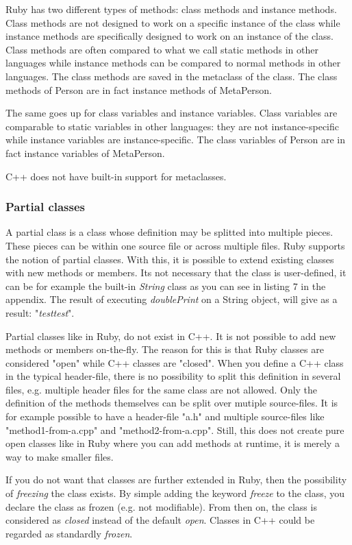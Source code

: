 \documentclass[10pt,a4paper,twocolumn]{article}
\begin{document}
Ruby has two different types of methods: class methods and instance methods. Class methods are not designed to work on a specific instance of the class while instance methods are specifically designed to work on an instance of the class. Class methods are often compared to what we call static methods in other languages while instance methods can be compared to normal methods in other languages. The class methods are saved in the metaclass of the class. The class methods of Person are in fact instance methods of MetaPerson.

The same goes up for class variables and instance variables. Class variables are comparable to static variables in other languages: they are not instance-specific while instance variables are instance-specific. The class variables of Person are in fact instance variables of MetaPerson.

C++ does not have built-in support for metaclasses.

\subsubsection{Partial classes}
A partial class is a class whose definition may be splitted into multiple pieces. These pieces can be within one source file or across multiple files. Ruby supports the notion of partial classes. With this, it is possible to extend existing classes with new methods or members. Its not necessary that the class is user-defined, it can be for example the built-in \textit{String} class as you can see in listing 7 in the appendix. The result of executing \textit{doublePrint} on a String object, will give as a result: "\textit{testtest}".

Partial classes like in Ruby, do not exist in C++. It is not possible to add new methods or members on-the-fly. The reason for this is that Ruby classes are considered "open" while C++ classes are "closed". When you define a C++ class in the typical header-file, there is no possibility to split this definition in several files, e.g. multiple header files for the same class are not allowed. Only the definition of the methods themselves can be split over mutiple source-files. It is for example possible to have a header-file "a.h" and multiple source-files like "method1-from-a.cpp" and "method2-from-a.cpp". Still, this does not create pure open classes like in Ruby where you can add methods at runtime, it is merely a way to make smaller files.

If you do not want that classes are further extended in Ruby, then the possibility of \textit{freezing} the class exists. By simple adding the keyword \textit{freeze} to the class, you declare the class as frozen (e.g. not modifiable). From then on, the class is considered as \textit{closed} instead of the default \textit{open}. Classes in C++ could be regarded as standardly \textit{frozen}.
\end{document}

